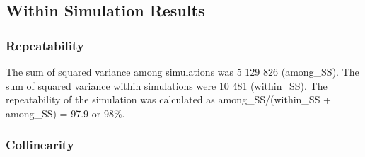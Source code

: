 \documentclass{article}
\begin{document}
\subsection{Within Simulation Results}

\subsubsection{Repeatability}
The sum of squared variance among simulations was 5 129 826 (among\_SS). The sum of squared variance within simulations were 10 481 (within\_SS). The repeatability of the simulation was calculated as among\_SS/(within\_SS + among\_SS) = 97.9 or 98\%. 

\subsubsection{Collinearity}
\end{document}
